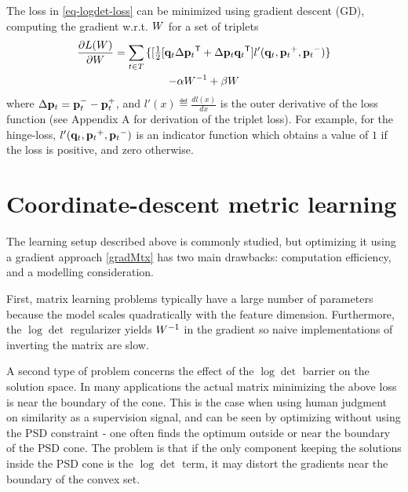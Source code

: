 \documentclass{article}
\begin{document}
The loss in \eqref{eq-logdet-loss} can be minimized using gradient descent (GD), computing the gradient w.r.t. ${W}$ for a set of triplets
\begin{multline}
  \frac{\partial {L ({W})}}{\partial {W}} = \sum\limits_{t\in T}{\{
  [\tfrac{1}{2}[{\mathbf{q}}_{t}\Delta{\mathbf{p}}_{t}{}^\mathsf{T} + \Delta{\mathbf{p}}_{t}{\mathbf{q}}_{t}{}^\mathsf{T}]  }
  {l'}({{\mathbf{q}}_{{t}}}, {{\mathbf{p}}_{{t}}}^{+}, {{\mathbf{p}}_{{t}}}^{-})\} \\- \alpha {W}^{-1} + \beta {W}
  \label{gradMtx}
\end{multline}
where $\Delta{\mathbf{p}}_t = {\mathbf{p}}_t^- - {\mathbf{p}}_t^+$, and $l'(x) \eqdef \frac{d{l(x)}}{dx}$ is the outer derivative of the loss function (see Appendix A for derivation of the triplet loss). For example, for the hinge-loss, 
$l'({{\mathbf{q}}_{{t}}}, {{\mathbf{p}}_{{t}}}^{+}, {{\mathbf{p}}_{{t}}}^{-})$ 
is an indicator function which obtains a value of $1$ if the loss is positive, and zero otherwise.


\section{Coordinate-descent metric learning}

The learning setup described above is commonly studied, but 
optimizing it using a gradient approach \eqref{gradMtx} has two main drawbacks: computation efficiency, and a modelling consideration.

First, matrix learning problems typically have a large number of parameters because the model scales quadratically with the feature dimension. %
Furthermore, the $\log \det$ regularizer yields  ${W}^{-1}$ in the gradient so naive implementations of inverting the matrix are slow.

A second type of problem concerns the effect of the $\log \det$ barrier on the solution space. In many applications the actual matrix minimizing the above loss is near the boundary of the cone. This is the case when using human judgment on similarity as a supervision signal, and can be seen by optimizing without using the PSD constraint - one often finds the optimum outside or near the boundary of the PSD cone.
The problem is that if the only component keeping the solutions inside the PSD cone is the $\log \det$ term, it may distort the gradients near the boundary of the convex set. 
\end{document}
